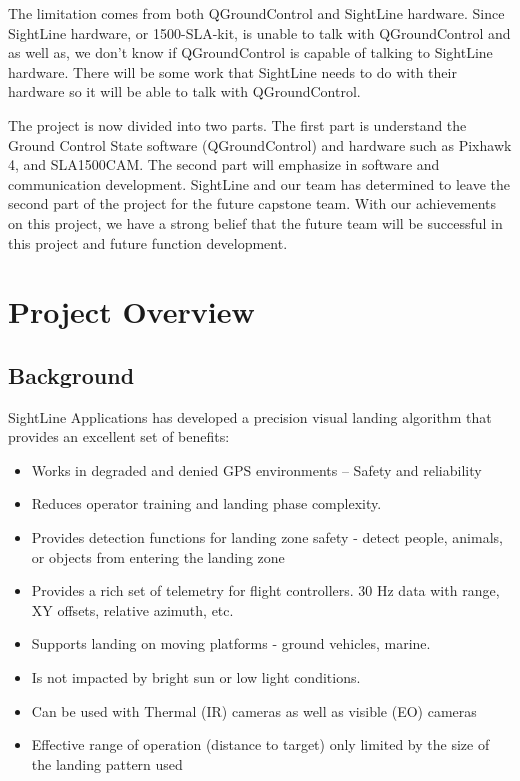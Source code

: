 \documentclass[11pt]{article}
\begin{document}
The limitation comes from both QGroundControl and SightLine hardware. Since SightLine hardware, or 1500-SLA-kit, is unable to talk with QGroundControl and as well as, we don't know if QGroundControl is capable of talking to SightLine hardware. There will be some work that SightLine needs to do with their hardware  so it will be able to talk with QGroundControl.  

The project is now divided into two parts. The first part is understand the Ground Control State software (QGroundControl) and hardware  such as Pixhawk 4, and SLA1500CAM. The second part will emphasize in software and communication development. SightLine and our team has determined to leave the second part of the project for the future capstone team. With our achievements on this project, we have a strong belief that the future team will be successful in this project and future function development.

\pagebreak

\tableofcontents

\pagebreak

\listoffigures

\pagebreak

\section{Project Overview}
\subsection{Background}
SightLine Applications has developed a precision visual landing algorithm that provides an excellent set of benefits:
\begin{itemize}
\item Works in degraded and denied GPS environments – Safety and reliability
\item	Reduces operator training and landing phase complexity.
\item	Provides detection functions for landing zone safety - detect people, animals, or objects from entering the landing zone
\item   Provides a rich set of telemetry for flight controllers.  30 Hz data with range, XY offsets, relative azimuth, etc.
\item	Supports landing on moving platforms - ground vehicles, marine.
\item	Is not impacted by bright sun or low light conditions.
\item	Can be used with Thermal (IR) cameras as well as visible (EO) cameras
\item	Effective range of operation (distance to target) only limited by the size of the landing pattern used
\end{itemize}
\end{document}
